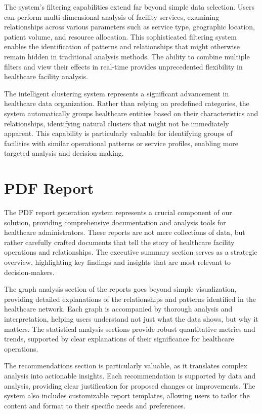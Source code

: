 \documentclass[12pt,a4paper]{report}
\begin{document}
The system's filtering capabilities extend far beyond simple data selection. Users can perform multi-dimensional analysis of facility services, examining relationships across various parameters such as service type, geographic location, patient volume, and resource allocation. This sophisticated filtering system enables the identification of patterns and relationships that might otherwise remain hidden in traditional analysis methods. The ability to combine multiple filters and view their effects in real-time provides unprecedented flexibility in healthcare facility analysis.

The intelligent clustering system represents a significant advancement in healthcare data organization. Rather than relying on predefined categories, the system automatically groups healthcare entities based on their characteristics and relationships, identifying natural clusters that might not be immediately apparent. This capability is particularly valuable for identifying groups of facilities with similar operational patterns or service profiles, enabling more targeted analysis and decision-making.

\section{PDF Report}
The PDF report generation system represents a crucial component of our solution, providing comprehensive documentation and analysis tools for healthcare administrators. These reports are not mere collections of data, but rather carefully crafted documents that tell the story of healthcare facility operations and relationships. The executive summary section serves as a strategic overview, highlighting key findings and insights that are most relevant to decision-makers.

The graph analysis section of the reports goes beyond simple visualization, providing detailed explanations of the relationships and patterns identified in the healthcare network. Each graph is accompanied by thorough analysis and interpretation, helping users understand not just what the data shows, but why it matters. The statistical analysis sections provide robust quantitative metrics and trends, supported by clear explanations of their significance for healthcare operations.

The recommendations section is particularly valuable, as it translates complex analysis into actionable insights. Each recommendation is supported by data and analysis, providing clear justification for proposed changes or improvements. The system also includes customizable report templates, allowing users to tailor the content and format to their specific needs and preferences.
\end{document}
